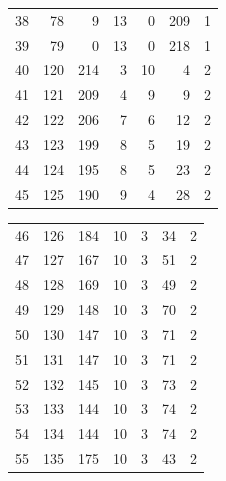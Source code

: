 \documentclass[a4paper,twoside,12pt]{book}
\begin{document}
\begin{appendices}
\begin{table}
\begin{tabular}{lrrrrrr}
		38  &     78 &         9 &        13 &               0 &             209 &         1 \\
		39  &     79 &         0 &        13 &               0 &             218 &         1 \\
		40  &    120 &       214 &         3 &              10 &               4 &         2 \\
		41  &    121 &       209 &         4 &               9 &               9 &         2 \\
		42  &    122 &       206 &         7 &               6 &              12 &         2 \\
		43  &    123 &       199 &         8 &               5 &              19 &         2 \\
		44  &    124 &       195 &         8 &               5 &              23 &         2 \\
		45  &    125 &       190 &         9 &               4 &              28 &         2 \\
		\bottomrule
	\end{tabular}		
\end{table}
\begin{table}
	\centering
	\begin{tabular}{lrrrrrr}
		\toprule
		46  &    126 &       184 &        10 &               3 &              34 &         2 \\
		47  &    127 &       167 &        10 &               3 &              51 &         2 \\
		48  &    128 &       169 &        10 &               3 &              49 &         2 \\
		49  &    129 &       148 &        10 &               3 &              70 &         2 \\
		50  &    130 &       147 &        10 &               3 &              71 &         2 \\
		51  &    131 &       147 &        10 &               3 &              71 &         2 \\
		52  &    132 &       145 &        10 &               3 &              73 &         2 \\
		53  &    133 &       144 &        10 &               3 &              74 &         2 \\
		54  &    134 &       144 &        10 &               3 &              74 &         2 \\
		55  &    135 &       175 &        10 &               3 &              43 &         2 \\

\end{tabular}
\end{table}
\end{appendices}
\end{document}
